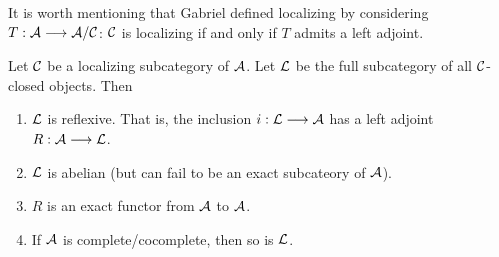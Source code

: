 \begin{rmk}
It is worth mentioning that Gabriel defined localizing by 
considering $T: \mathcal{A} \longrightarrow \mathcal{A}/\mathcal{C}$: $\mathcal{C}$ is 
localizing if and only if $T$ admits a left adjoint.
\end{rmk}

\begin{thm}
Let $\mathcal{C}$ be a localizing subcategory of $\mathcal{A}$. Let
$\mathcal{L}$ be the full subcategory of all $\mathcal{C}$-closed objects.
Then
\begin{enumerate}
\item $\mathcal{L}$ is reflexive. That is, the inclusion $i: \mathcal{L}
\longrightarrow \mathcal{A}$ has a left adjoint $R: \mathcal{A} \longrightarrow \mathcal{L}$.

\item $\mathcal{L}$ is abelian (but can fail to be an exact subcateory
of $\mathcal{A}$).

\item $R$ is an exact functor from $\mathcal{A}$ to $\mathcal{A}$.

\item If $\mathcal{A}$ is complete/cocomplete, then so is
$\mathcal{L}$.
\end{enumerate}
\end{thm}


